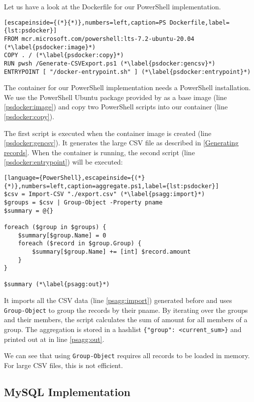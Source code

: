 Let us have a look at the Dockerfile for our PowerShell implementation.

\begin{lstlisting}[escapeinside={(*}{*)},numbers=left,caption=PS Dockerfile,label={lst:psdocker}]
FROM mcr.microsoft.com/powershell:lts-7.2-ubuntu-20.04 (*\label{psdocker:image}*)
COPY . / (*\label{psdocker:copy}*)
RUN pwsh /Generate-CSVExport.ps1 (*\label{psdocker:gencsv}*)
ENTRYPOINT [ "/docker-entrypoint.sh" ] (*\label{psdocker:entrypoint}*)
\end{lstlisting}
The container for our PowerShell implementation needs
a PowerShell installation. We use the PowerShell Ubuntu package
provided by \cite{dockerPS} as a base image (line \ref{psdocker:image})
and copy two PowerShell scripts into our container (line \ref{psdocker:copy}).

The first script is executed when the container image is created
(line \ref{psdocker:gencsv}). It generates the large CSV
file as described in \ref{Generating records}. When the container
is running, the second script (line \ref{psdocker:entrypoint})
will be executed:

\begin{lstlisting}[language={PowerShell},escapeinside={(*}{*)},numbers=left,caption=aggregate.ps1,label={lst:psdocker}]
$csv = Import-CSV "./export.csv" (*\label{psagg:import}*)
$groups = $csv | Group-Object -Property pname
$summary = @{}

foreach ($group in $groups) {
    $summary[$group.Name] = 0
    foreach ($record in $group.Group) {
        $summary[$group.Name] += [int] $record.amount
    }
}

$summary (*\label{psagg:out}*)
\end{lstlisting}
It imports all the CSV data (line \ref{psagg:import}) generated
before and uses \verb+Group-Object+ to group the records by their pname.
By iterating over the groups and their members, the script calculates
the sum of amount for all members of a group. The
aggregation is stored in a hashlist
\verb+{"group": <current_sum>}+ and printed out at in line \ref{psagg:out}.

We can see that using \verb+Group-Object+ requires all records
to be loaded in memory. For large CSV files, this is not efficient.

\subsection{MySQL Implementation}

